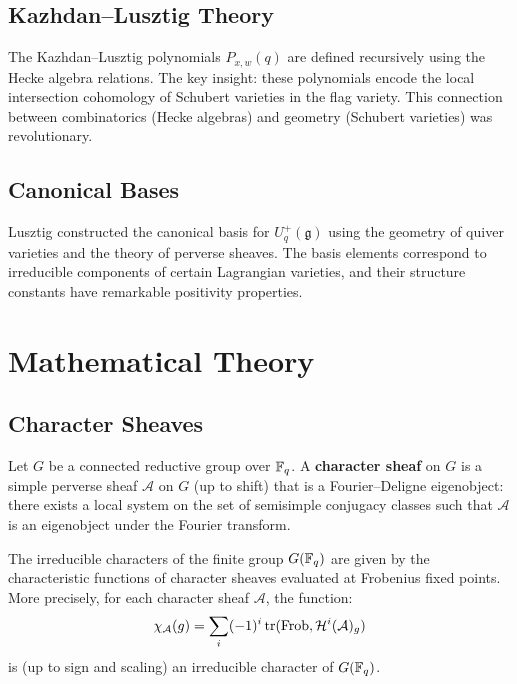 \subsection{Kazhdan--Lusztig Theory}

The Kazhdan--Lusztig polynomials $P_{x,w}(q)$ are defined recursively using the Hecke algebra relations. The key insight: these polynomials encode the local intersection cohomology of Schubert varieties in the flag variety. This connection between combinatorics (Hecke algebras) and geometry (Schubert varieties) was revolutionary.

\subsection{Canonical Bases}

Lusztig constructed the canonical basis for $U_q^+(\mathfrak{g})$ using the geometry of quiver varieties and the theory of perverse sheaves. The basis elements correspond to irreducible components of certain Lagrangian varieties, and their structure constants have remarkable positivity properties.

\section{Mathematical Theory}

\subsection{Character Sheaves}

\begin{definition}
Let $G$ be a connected reductive group over $\mathbb{F}_q$. A \textbf{character sheaf} on $G$ is a simple perverse sheaf $\mathcal{A}$ on $G$ (up to shift) that is a Fourier--Deligne eigenobject: there exists a local system on the set of semisimple conjugacy classes such that $\mathcal{A}$ is an eigenobject under the Fourier transform.
\end{definition}

\begin{theorem}[Lusztig, 1980s]
The irreducible characters of the finite group $G(\mathbb{F}_q)$ are given by the characteristic functions of character sheaves evaluated at Frobenius fixed points. More precisely, for each character sheaf $\mathcal{A}$, the function:
\[
\chi_{\mathcal{A}}(g) = \sum_i (-1)^i \operatorname{tr}(\operatorname{Frob}, \mathcal{H}^i(\mathcal{A})_g)
\]
is (up to sign and scaling) an irreducible character of $G(\mathbb{F}_q)$.
\end{theorem}

